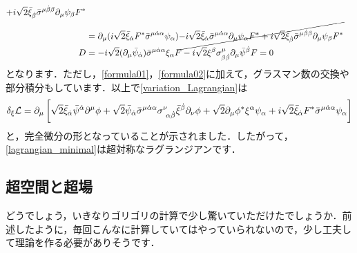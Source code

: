 \documentclass[a4paper,uplatex,dvipdfmx]{jsarticle}
\theoremstyle{definition}
\begin{document}
\begin{align}
  +
  i\sqrt{2}\bar{\xi}_{\dot{\beta}}\bar{\sigma}^{\mu\dot{\beta}\beta}\partial_{\mu}\psi_{\beta}F^{*}
  \nonumber
  \\
  &=
  \partial_{\mu}
  (
    i\sqrt{2}\bar{\xi}_{\dot{\alpha}}F^{*}\bar{\sigma}^{\mu\dot{\alpha}\alpha}\psi_{\alpha}
  )
  \cancel{
    -
    i\sqrt{2}\bar{\xi}_{\dot{\alpha}}\bar{\sigma}^{\mu\dot{\alpha}\alpha}\partial_{\mu}\psi_{\alpha}F^{*}
    +
    i\sqrt{2}\bar{\xi}_{\dot{\beta}}\bar{\sigma}^{\mu\dot{\beta}\beta}\partial_{\mu}\psi_{\beta}F^{*}
  }
  \\
  D
  &=
  -
  i\sqrt{2}(\partial_{\mu}\bar{\psi}_{\dot{\alpha}})\bar{\sigma}^{\mu\dot{\alpha}\alpha}\xi_{\alpha}F
  -
  i\sqrt{2}\xi^{\beta}\sigma^{\mu}_{\beta\dot{\beta}}\partial_{\mu}\bar{\psi}^{\dot{\beta}}F
  =
  0
\end{align}
となります．ただし，\eqref{formula01}，\eqref{formula02}に加えて，グラスマン数の交換や部分積分もしています．以上で\eqref{variation_Lagrangian}は
\begin{equation}
  \delta_{\xi}\mathcal{L}
  =
  \partial_{\mu}
  \left[  
    \vphantom{\dfrac{1}{2}}
    \sqrt{2}\bar{\xi}_{\dot{\alpha}}\bar{\psi}^{\dot{\alpha}}\partial^{\mu}\phi
    +
    \sqrt{2}\bar{\psi}_{\dot{\alpha}}\bar{\sigma}^{\mu\dot{\alpha}\alpha}\sigma^{\nu}_{\ \alpha\dot{\beta}}\bar{\xi}^{\dot{\beta}}\partial_{\nu}\phi
    +
    \sqrt{2}\partial_{\mu}\phi^{*}\xi^{\alpha}\psi_{\alpha}
    +
    i\sqrt{2}\bar{\xi}_{\dot{\alpha}}F^{*}\bar{\sigma}^{\mu\dot{\alpha}\alpha}\psi_{\alpha}
  \right]
\end{equation}
と，完全微分の形となっていることが示されました．したがって，\eqref{lagrangian_minimal}は超対称なラグランジアンです．


\subsection{超空間と超場}

どうでしょう，いきなりゴリゴリの計算で少し驚いていただけたでしょうか．前述したように，毎回こんなに計算していてはやっていられないので，少し工夫して理論を作る必要がありそうです．
\end{document}
